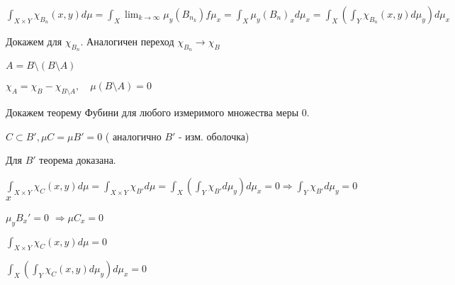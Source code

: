 $\int_{X \times Y} \chi_{B_n} (x,y) d \mu = \int_X \lim_{k
\rightarrow \infty} \mu_y (B_{n_k}) f \mu_x = \int_X \mu_y (B_n)_x
d \mu_x = \int_X (\int_Y \chi_{B_n} (x,y) d \mu_y) d \mu_x$

Докажем для $\chi_{B_n}$. Аналогичен переход $\chi_{B_n}
\rightarrow \chi_B$

$A = B \setminus(B \setminus A)$

$\chi_A = \chi_B - \chi_{B \setminus A}, \quad \mu(B \setminus A)
= 0$

Докажем теорему Фубини для любого измеримого множества меры 0.

$C \subset B', \mu C = \mu B' = 0$ ( аналогично $B'$ - изм.
оболочка)

Для $B'$ теорема доказана.

$\int_{X \times Y} \chi_C (x,y) d \mu = \int_{X \times Y}
\chi_{B'} d \mu = \int_X (\int_Y \chi_{B'} d \mu_y) d \mu_x = 0
\Rightarrow \int_Y \chi_{B'} d \mu_y = 0$ $x$

$\mu_y B_x ' = 0$ $\Rightarrow \mu C_x = 0$

$\int_{X \times Y} \chi_C (x, y) d \mu = 0$

$\int_X(\int_Y \chi_C (x,y) d \mu_y) d \mu_x = 0$

